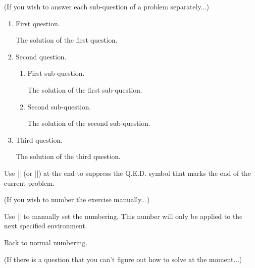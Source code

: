 \documentclass[11pt,
  logo = {example-image},
  title in boldface,
  theorem in new line,
  colored solution,
]{homework}
\begin{document}
\bigskip\textcolor{gray!55}{(If you wish to answer each sub-question of a problem separately...)}

\begin{problem}
    \begin{enumerate}
        \item First question.

        \begin{solution}
            The solution of the first question.
        \end{solution}

        \item Second question.

        \begin{enumerate}
            \item First sub-question.

            \begin{solution}
                The solution of the first sub-question.
            \end{solution}

            \item Second sub-question.

            \begin{solution}
                The solution of the second sub-question.
            \end{solution}

        \end{enumerate}

        \item Third question.

        \begin{solution}
            The solution of the third question.
        \end{solution}

    \end{enumerate}
    Use \cverb|\noqed| (or \cverb|\noQED|) at the end to suppress the Q.E.D. symbol that marks the end of the current problem.
    \noQED
\end{problem}


\bigskip\textcolor{gray!55}{(If you wish to number the exercise manually...)}

\begin{exercise}
    Use \cverb|\ManualNumbering| to manually set the numbering. This number will only be applied to the next specified environment.
\end{exercise}

\begin{exercise}
    Back to normal numbering.
\end{exercise}


\bigskip\textcolor{gray!55}{(If there is a question that you can't figure out how to solve at the moment...)}

\end{document}
